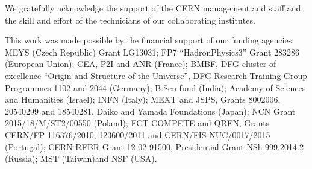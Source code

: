 We gratefully acknowledge the support of the CERN management and staff 
and the skill and effort of the technicians of our collaborating institutes.

This work was made possible by the financial support of our funding agencies:
MEYS (Czech Republic) Grant LG13031; 
FP7 ``HadronPhysics3'' Grant 283286 (European Union); 
CEA, P2I and ANR (France); 
BMBF, DFG cluster of excellence ``Origin and Structure of the Universe'',
DFG Research Training Group Programmes 1102 and 2044 (Germany); 
B.Sen fund (India); 
Academy of Sciences and Humanities (Israel); 
INFN (Italy); 
MEXT and JSPS, Grants 8002006, 20540299 and 18540281, Daiko and Yamada Foundations (Japan); 
NCN Grant 2015/18/M/ST2/00550 (Poland); 
FCT COMPETE and QREN, Grants CERN/FP 116376/2010, 123600/2011 and CERN/FIS-NUC/0017/2015 (Portugal); 
CERN-RFBR Grant 12-02-91500, Presidential Grant NSh-999.2014.2 (Russia);
MST (Taiwan)and
NSF (USA).

